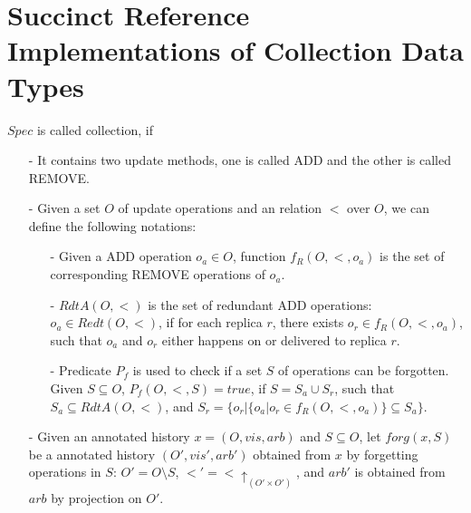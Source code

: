 
\section{Succinct Reference Implementations of Collection Data Types}
\label{sec:succinct reference implementations of collection data types}

$Spec$ is called collection, if

\begin{itemize}
\setlength{\itemsep}{0.5pt}
\item[-] It contains two update methods, one is called ADD and the other is called REMOVE.

\item[-] Given a set $O$ of update operations and an relation $<$ over $O$, we can define the following notations:

    \begin{itemize}
    \setlength{\itemsep}{0.5pt}
    \item[-] Given a ADD operation $o_a \in O$, function $f_R(O,<,o_a)$ is the set of corresponding REMOVE operations of $o_a$.

    \item[-] $RdtA(O,<)$ is the set of redundant ADD operations: $o_a \in Redt(O,<)$, if for each replica $r$, there exists $o_r \in f_R(O,<,o_a)$, such that $o_a$ and $o_r$ either happens on or delivered to replica $r$.

    \item[-] Predicate $P_f$ is used to check if a set $S$ of operations can be forgotten. Given $S \subseteq O$, $P_f(O,<,S) = \mathit{true}$, if $S = S_a \cup S_r$, such that $S_a \subseteq RdtA(O,<)$, and $S_r = \{ o_r \vert  \{ o_a \vert o_r \in f_R(O,<,o_a) \} \subseteq S_a \}$.
    \end{itemize}


\item[-] Given an annotated history $x = (O,\mathit{vis},\mathit{arb})$ and $S \subseteq O$, let $forg(x,S)$ be a annotated history $(O',\mathit{vis}',\mathit{arb}')$ obtained from $x$ by forgetting operations in $S$: $O' = O \setminus S$, $<' = < \uparrow_{(O' \times O')}$, and $\mathit{arb}'$ is obtained from $\mathit{arb}$ by projection on $O'$.


\end{itemize}
